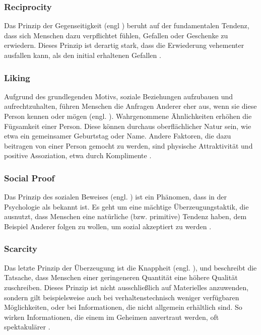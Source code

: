 \subsubsection{Reciprocity}
Das Prinzip der Gegenseitigkeit (engl ) beruht auf der fundamentalen Tendenz, dass sich Menschen dazu verpflichtet fühlen, Gefallen oder Geschenke zu erwiedern.
Dieses Prinzip ist derartig stark, dass die Erwiederung vehementer ausfallen kann, als den initial erhaltenen Gefallen .

\subsubsection{Liking}
Aufgrund des grundlegenden Motivs, soziale Beziehungen aufzubauen und aufrechtzuhalten, führen Menschen die Anfragen Anderer eher aus, wenn sie diese Person kennen oder mögen (engl. ).
Wahrgenommene Ähnlichkeiten erhöhen die Fügsamkeit einer Person. Diese können durchaus oberflächlicher Natur sein, wie etwa ein gemeinsamer Geburtstag oder Name.
Andere Faktoren, die dazu beitragen von einer Person gemocht zu werden, sind physische Attraktivität und positive Assoziation, etwa durch Komplimente .

\subsubsection{Social Proof}
Das Prinzip des sozialen Beweises (engl. ) ist ein Phänomen, dass in der Psychologie als  bekannt ist.
Es geht um eine mächtige Überzeugungstaktik, die ausnutzt, dass Menschen eine natürliche (bzw. primitive) Tendenz haben, dem Beispiel Anderer folgen zu wollen, um sozial akzeptiert zu werden .

\subsubsection{Scarcity}
Das letzte Prinzip der Überzeugung ist die Knappheit (engl. ), und beschreibt die Tatsache, dass Menschen einer geringeneren Quantität eine höhere Qualität zuschreiben.
Dieses Prinzip ist nicht ausschließlich auf Materielles anzuwenden, sondern gilt beispielsweise auch bei verhaltenstechnisch weniger verfügbaren Möglichkeiten, oder bei Informationen, die nicht allgemein erhältlich sind.
So wirken Informationen, die einem im Geheimen anvertraut werden, oft spektakulärer .


